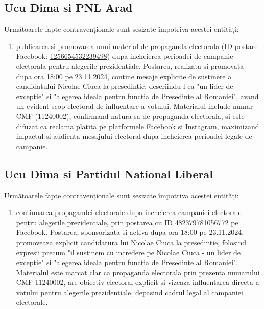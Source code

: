 \documentclass[a4paper,12pt]{article}
\begin{document}
\vspace{0.5cm}

\subsection{Ucu Dima si PNL Arad}
Următoarele fapte contravenționale sunt sesizate împotriva acestei entități:

\begin{enumerate}[leftmargin=*, label=\arabic*.)]
    \item publicarea si promovarea unui material de propaganda electorala (ID postare Facebook: \href{https://www.facebook.com/ads/library/?id=1256654532239498}{1256654532239498}) dupa incheierea perioadei de campanie electorala pentru alegerile prezidentiale. Postarea, realizata si promovata dupa ora 18:00 pe 23.11.2024, contine mesaje explicite de sustinere a candidatului Nicolae Ciuca la presedintie, descriindu-l ca "un lider de exceptie" si "alegerea ideala pentru functia de Presedinte al Romaniei", avand un evident scop electoral de influentare a votului. Materialul include numar CMF (11240002), confirmand natura sa de propaganda electorala, si este difuzat ca reclama platita pe platformele Facebook si Instagram, maximizand impactul si audienta mesajului electoral dupa incheierea perioadei legale de campanie.
\end{enumerate}

\vspace{0.5cm}

\subsection{Ucu Dima si Partidul National Liberal}
Următoarele fapte contravenționale sunt sesizate împotriva acestei entități:

\begin{enumerate}[leftmargin=*, label=\arabic*.)]
    \item continuarea propagandei electorale dupa incheierea campaniei electorale pentru alegerile prezidentiale, prin postarea cu ID \href{https://www.facebook.com/ads/library/?id=482379781056772}{482379781056772} pe Facebook. Postarea, sponsorizata si activa dupa ora 18:00 pe 23.11.2024, promoveaza explicit candidatura lui Nicolae Ciuca la presedintie, folosind expresii precum "il sustinem cu incredere pe Nicolae Ciuca - un lider de exceptie" si "alegerea ideala pentru functia de Presedinte al Romaniei". Materialul este marcat clar ca propaganda electorala prin prezenta numarului CMF 11240002, are obiectiv electoral explicit si vizeaza influentarea directa a votului pentru alegerile prezidentiale, depasind cadrul legal al campaniei electorale.
\end{enumerate}
\end{document}
